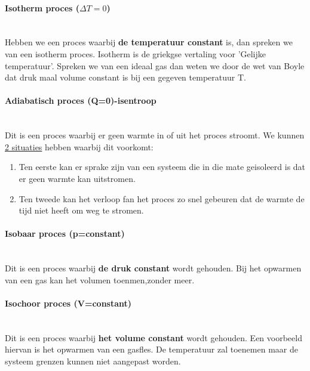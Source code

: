 \documentclass[12pt]{article}
\newcommand{\myparagraph}[1]{\paragraph{#1}\mbox{}\\}
\begin{document}
\myparagraph{Isotherm proces ($\Delta T=0$)}
Hebben we een proces waarbij \textbf{de temperatuur constant} is, dan spreken we van een isotherm proces. Isotherm is de griekgse vertaling voor 'Gelijke temperatuur'. Spreken we van een ideaal gas dan weten we door de wet van Boyle dat druk maal volume constant is bij een gegeven temperatuur T.
\myparagraph{Adiabatisch proces (Q=0)-isentroop}
Dit is een proces waarbij er geen warmte in of uit het proces stroomt. We kunnen \underline{2 situaties} hebben waarbij dit voorkomt:\begin{enumerate}
    \item Ten eerste kan er sprake zijn van een systeem die in die mate geisoleerd is dat er geen warmte kan uitstromen.
    \item Ten tweede kan het verloop fan het proces zo snel gebeuren dat de warmte de tijd niet heeft om weg te stromen.
\end{enumerate}
\myparagraph{Isobaar proces (p=constant)}
Dit is een proces waarbij \textbf{de druk constant} wordt gehouden.
Bij het opwarmen van een gas kan het volumen toenmen,zonder meer.
\myparagraph{Isochoor proces (V=constant)}
Dit is een proces waarbij \textbf{het volume constant} wordt gehouden.
Een voorbeeld hiervan is het opwarmen van een gasfles. De temperatuur zal toenemen maar de systeem grenzen kunnen niet aangepast worden.
\end{document}
